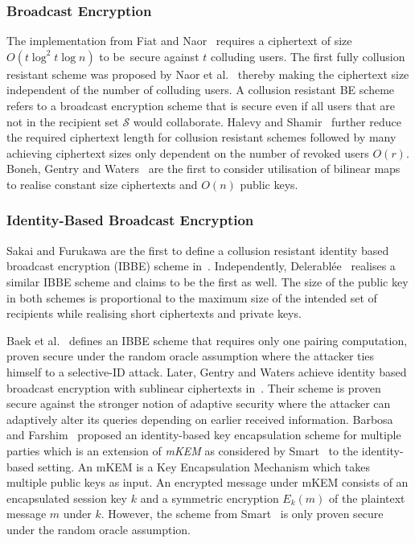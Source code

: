 \subsubsection{Broadcast Encryption}
The implementation from Fiat and Naor~\cite{art:FiatN93} requires a ciphertext of size  $O \left( t \log^2 t \log n \right)$ to be~secure against $t$ colluding users. The first fully collusion resistant scheme was proposed by Naor et al.~\cite{art:NaorNL01} thereby making the ciphertext size independent of the number of colluding users. A collusion resistant BE scheme refers to a broadcast encryption scheme that is secure even if all users that are not in the recipient set $\mathcal{S}$ would collaborate. Halevy and Shamir~\cite{art:HalevyS02} further reduce the required ciphertext length for collusion resistant schemes followed by many~\cite{art:DodisF02,art:GoodrichST04,art:LewkoSW08} achieving ciphertext sizes only dependent on the number of revoked users $O \left( r \right)$. Boneh, Gentry and Waters~\cite{art:BonehBG05} are the first to consider utilisation of bilinear maps to realise constant size ciphertexts and $O \left( n \right)$ public keys.

\subsubsection{Identity-Based Broadcast Encryption}
Sakai and Furukawa are the first to define a collusion resistant identity based broadcast encryption (IBBE) scheme in~\cite{art:SakaiF07}. Independently, Delerabl\'{e}e~\cite{art:Delerablee07} realises a similar IBBE scheme and claims to be the first as well.  The size of the public key in both schemes is proportional to the maximum size of the intended set of recipients while realising short ciphertexts and private keys. 

Baek et al.~\cite{art:BaekNSS04} defines an IBBE scheme that requires only one pairing computation, proven secure under the random oracle assumption where the attacker ties himself to a selective-ID attack. Later, Gentry and Waters achieve identity based broadcast encryption with sublinear ciphertexts in~\cite{art:GentryW08}. Their scheme is proven secure against the stronger notion of adaptive security where the attacker can adaptively alter its queries depending on earlier received information. Barbosa and Farshim~\cite{art:BarbosaF05} proposed an identity-based key encapsulation scheme for multiple parties which is an extension of \textit{mKEM} as considered by Smart~\cite{art:Smart04} to the identity-based setting. An mKEM is a Key Encapsulation Mechanism which takes multiple public keys as input. An encrypted message under mKEM consists of an encapsulated session key $k$ and a symmetric encryption $E_k \left( m \right)$ of the plaintext message $m$ under $k$. However, the scheme from Smart~\cite{art:Smart04} is only proven secure under the random oracle assumption.

